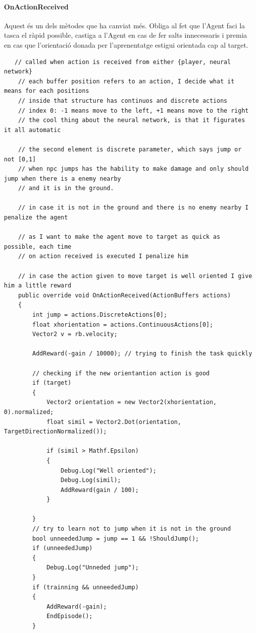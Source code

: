 \documentclass{article}
\begin{document}
    \newpage
    
    \paragraph{OnActionReceived}
    Aquest és un dels mètodes que ha canviat més. Obliga al fet que l'Agent faci la tasca el ràpid possible, castiga a l'Agent en cas de fer salts innecessaris i premia en cas que l'orientació donada per l'aprenentatge estigui orientada cap al target.
    
    \begin{lstlisting}
   // called when action is received from either {player, neural network}
    // each buffer position refers to an action, I decide what it means for each positions
    // inside that structure has continuos and discrete actions
    // index 0: -1 means move to the left, +1 means move to the right
    // the cool thing about the neural network, is that it figurates it all automatic

    // the second element is discrete parameter, which says jump or not [0,1]
    // when npc jumps has the hability to make damage and only should jump when there is a enemy nearby
    // and it is in the ground.

    // in case it is not in the ground and there is no enemy nearby I penalize the agent

    // as I want to make the agent move to target as quick as possible, each time
    // on action received is executed I penalize him

    // in case the action given to move target is well oriented I give him a little reward
    public override void OnActionReceived(ActionBuffers actions)
    {
        int jump = actions.DiscreteActions[0];
        float xhorientation = actions.ContinuousActions[0];
        Vector2 v = rb.velocity;

        AddReward(-gain / 10000); // trying to finish the task quickly 

        // checking if the new orientantion action is good
        if (target)
        {
            Vector2 orientation = new Vector2(xhorientation, 0).normalized;
            float simil = Vector2.Dot(orientation, TargetDirectionNormalized());

            if (simil > Mathf.Epsilon)
            {
                Debug.Log("Well oriented");
                Debug.Log(simil);
                AddReward(gain / 100);
            }

        }
        // try to learn not to jump when it is not in the ground
        bool unneededJump = jump == 1 && !ShouldJump();
        if (unneededJump)
        {
            Debug.Log("Unneded jump");
        }
        if (trainning && unneededJump)
        {
            AddReward(-gain);
            EndEpisode();
        }


\end{lstlisting}
\end{document}
